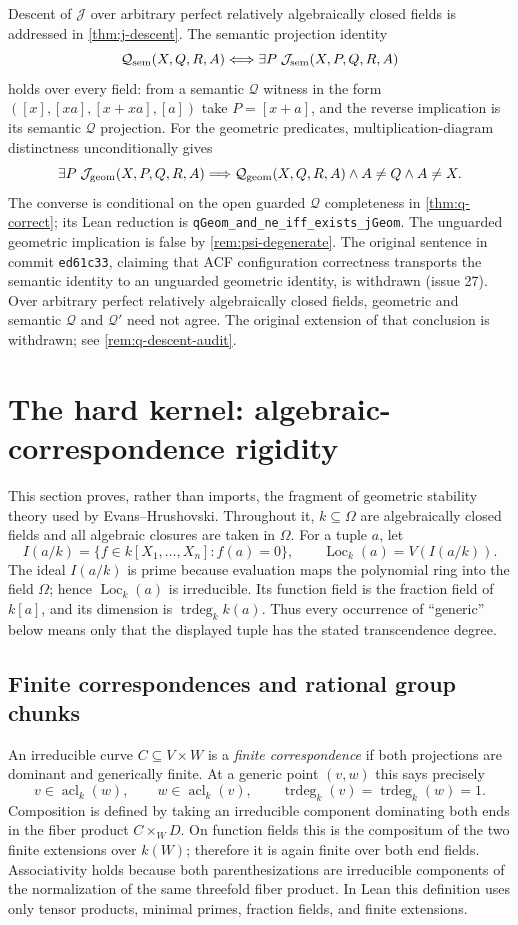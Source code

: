 \documentclass[11pt,oneside]{article}
\theoremstyle{definition}
\theoremstyle{remark}
\newcommand{\acl}{\operatorname{acl}}
\newcommand{\trdeg}{\operatorname{trdeg}}
\newcommand{\Loc}{\operatorname{Loc}}
\newcommand{\Qrel}{\mathcal{Q}}
\newcommand{\Qprel}{\mathcal{Q}'}
\newcommand{\Jrel}{\mathcal{J}}
\newcommand{\lean}[1]{\nolinkurl{#1}}
\begin{document}
Descent of $\Jrel$ over arbitrary perfect relatively algebraically closed fields is
addressed in \cref{thm:j-descent}.  The semantic projection identity
\[
 \Qrel_{\rm sem}(X,Q,R,A)\Longleftrightarrow
 \exists P\;\Jrel_{\rm sem}(X,P,Q,R,A)
\]
holds over every field: from a semantic $\Qrel$ witness in the form
$([x],[xa],[x+xa],[a])$ take $P=[x+a]$, and the reverse implication is its semantic
$\Qrel$ projection.  For the geometric predicates, multiplication-diagram distinctness
unconditionally gives
\[
 \exists P\;\Jrel_{\rm geom}(X,P,Q,R,A)\Longrightarrow
 \Qrel_{\rm geom}(X,Q,R,A)\land A\ne Q\land A\ne X.
\]
The converse is conditional on the open guarded $\Qrel$ completeness in
\cref{thm:q-correct}; its Lean reduction is \lean{qGeom_and_ne_iff_exists_jGeom}.
The unguarded geometric implication is false by \cref{rem:psi-degenerate}.
The original sentence in commit \texttt{ed61c33}, claiming that ACF configuration
correctness transports the semantic identity to an unguarded geometric identity,
is withdrawn (issue 27).  Over arbitrary perfect
relatively algebraically closed fields, geometric and semantic $\Qrel$ and $\Qprel$
need not agree. The original extension of that conclusion is withdrawn; see
\cref{rem:q-descent-audit}.

\section{The hard kernel: algebraic-correspondence rigidity}\label{sec:rigidity}

This section proves, rather than imports, the fragment of geometric stability theory used
by Evans--Hrushovski.  Throughout it, $k\subseteq\Omega$ are algebraically closed fields
and all algebraic closures are taken in $\Omega$.  For a tuple $a$, let
\[
 I(a/k)=\{f\in k[X_1,\ldots,X_n]:f(a)=0\},\qquad
 \Loc_k(a)=V(I(a/k)).
\]
The ideal $I(a/k)$ is prime because evaluation maps the polynomial ring into the field
$\Omega$; hence $\Loc_k(a)$ is irreducible.  Its function field is the fraction field of
$k[a]$, and its dimension is $\trdeg_k k(a)$.  Thus every occurrence of ``generic'' below
means only that the displayed tuple has the stated transcendence degree.

\subsection{Finite correspondences and rational group chunks}

An irreducible curve $C\subseteq V\times W$ is a \emph{finite correspondence} if both
projections are dominant and generically finite.  At a generic point $(v,w)$ this says
precisely
\[
 v\in\acl_k(w),\qquad w\in\acl_k(v),\qquad
 \trdeg_k(v)=\trdeg_k(w)=1.                                    \tag{8.1}
\]
Composition is defined by taking an irreducible component dominating both ends in the
fiber product $C\times_WD$.  On function fields this is the compositum of the two finite
extensions over $k(W)$; therefore it is again finite over both end fields.  Associativity
holds because both parenthesizations are irreducible components of the normalization of
the same threefold fiber product.  In Lean this definition uses only tensor products,
minimal primes, fraction fields, and finite extensions.
\end{document}
